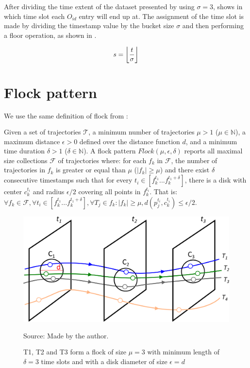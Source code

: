 After dividing the time extent of the dataset presented by  using $\sigma = 3$,
 shows in which time slot each $O_{id}$ entry will end up at. The assignment of the time slot is
made by dividing the timestamp value by the bucket size $\sigma$ and then performing a floor operation, as shown in
.

\begin{equation}
    \label{eq:timeslot}
    s = \floor*{\frac{t}{\sigma}}
\end{equation}

\section{Flock pattern}
\label{sec:tech_flock}
We use the same definition of flock from :

\begin{Def}
\label{def:flock}
Given a set of trajectories $\mathcal{T}$, a minimum number of trajectories $\mu > 1$ ($\mu \in \mathbb{N}$), a maximum
distance $\epsilon > 0$ defined over the distance function $d$, and a minimum time duration $\delta > 1$ ($\delta \in
\mathbb{N}$). A flock pattern $Flock (\mu, \epsilon, \delta)$ reports all maximal size collections $\mathcal{F}$ of
trajectories where: for each $f_k$ in $\mathcal{F}$, the number of trajectories in $f_k$ is greater or equal than $\mu$
($|f_k| \ge \mu$) and there exist $\delta$ consecutive timestamps such that for every $t_i \in [f_k^{t_1}...f_k^{t_1 +
\delta}]$, there is a disk with center $c_k^{t_i}$ and radius $\epsilon/2$ covering all points in $f_k^{t_i}$. That is:
$\forall f_k \in \mathcal{F}, \forall t_i \in [f_k^{t_1}...f_k^{t_1 + \delta}], \forall T_j \in f_k: |f_k | \ge \mu,
d(p_j^{t_i},c_k^{t_i}) \le \epsilon/2$.
\end{Def}

\begin{figure}[h!]
    \centering
    \caption{T1, T2 and T3 form a flock of size $\mu =3$ with minimum length of $\delta = 3$ time slots and with a disk
        diameter of size $\epsilon = d$}
    \centerline{\includegraphics[width=\textwidth]{images/flock.eps}}
    \footnotesize{Source: Made by the author.}
    \label{fig:flock2}
\end{figure}

